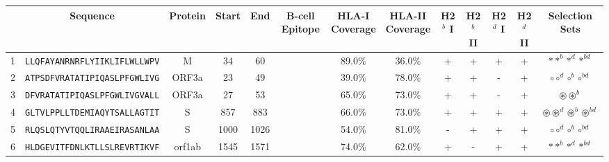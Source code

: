 \begin{tabular}{rcccccccccccc}
\toprule
{} &                              Sequence & Protein &  Start &   End & B-cell Epitope & \Centerstack{HLA-I \\ Coverage} & \Centerstack{HLA-II \\ Coverage} & H2$^{b}$ I & H2$^{b}$ II & H2$^{d}$ I & H2$^{d}$ II &                                                                                                      Selection Sets \\
\midrule
1  &  \texttt{LLQFAYANRNRFLYIIKLIFLWLLWPV} &       M &     34 &    60 &                &                          89.0\% &                           36.0\% &          + &           + &          + &           + &                                                                                    $ \ast \ast^b \ast^d \ast^{bd} $ \\
2  &  \texttt{ATPSDFVRATATIPIQASLPFGWLIVG} &   ORF3a &     23 &    49 &                &                          39.0\% &                           78.0\% &          + &           + &          - &           + &                                                                                $ \circ \circ^d \circ^b \circ^{bd} $ \\
3  &  \texttt{DFVRATATIPIQASLPFGWLIVGVALL} &   ORF3a &     27 &    53 &                &                          65.0\% &                           73.0\% &          + &           + &          - &           + &                                                                                       $ \circledast \circledast^b $ \\
4  &  \texttt{GLTVLPPLLTDEMIAQYTSALLAGTIT} &       S &    857 &   883 &                &                          66.0\% &                           73.0\% &          + &           + &          + &           + &                                                        $ \circledast \circledast^d \circledast^b \circledast^{bd} $ \\
5  &  \texttt{RLQSLQTYVTQQLIRAAEIRASANLAA} &       S &   1000 &  1026 &                &                          54.0\% &                           81.0\% &          - &           + &          + &           + &                                                                                $ \circ \circ^d \circ^b \circ^{bd} $ \\
6  &  \texttt{HLDGEVITFDNLKTLLSLREVRTIKVF} &  orf1ab &   1545 &  1571 &                &                          74.0\% &                           62.0\% &          + &           - &          + &           + &                                                                                    $ \ast \ast^b \ast^d \ast^{bd} $ \\

\end{tabular}
